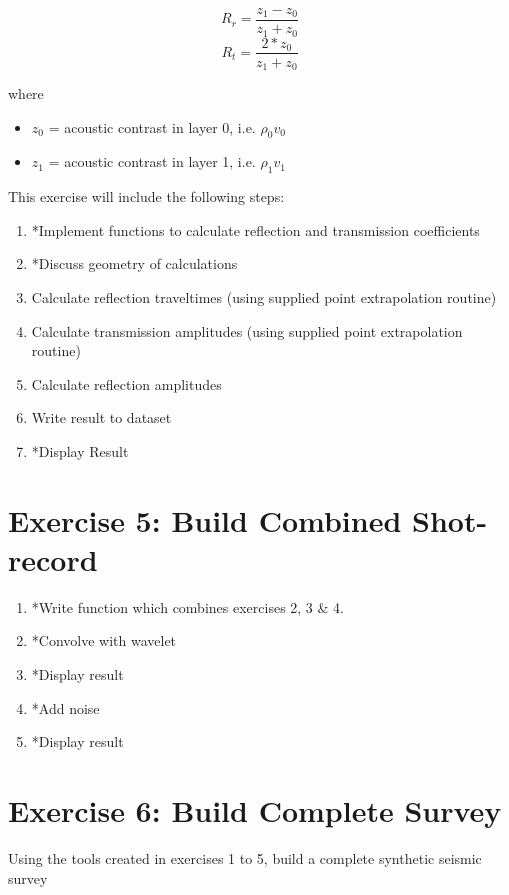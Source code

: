 \documentclass[a4paper, 10pt]{article}
\begin{document}
\[ R_r = \frac{z_1 - z_0}{z_1+z_0}\]
\[ R_t = \frac{2*z_0}{z_1+z_0}\]

where 
\begin{itemize}
\item $z_0$  = acoustic contrast in layer 0, i.e. $\rho_0 v_0$
\item $z_1$ = acoustic contrast in layer 1, i.e. $\rho_1 v_1$
\end{itemize}

This exercise will include the following steps:


\begin{enumerate}
\item *Implement functions to calculate reflection and transmission coefficients
\item *Discuss geometry of calculations
\item Calculate reflection traveltimes (using supplied point extrapolation routine)
\item Calculate transmission amplitudes (using supplied point extrapolation routine)
\item Calculate reflection amplitudes
\item Write result to dataset
\item *Display Result
\end{enumerate}


\section*{Exercise 5: Build Combined Shot-record}

\begin{enumerate}
\item *Write function which combines exercises 2, 3 \& 4.
\item *Convolve with wavelet
\item *Display result
\item *Add noise
\item *Display result
\end{enumerate}
\section*{Exercise 6: Build Complete Survey}

Using the tools created in exercises 1 to 5, build a complete synthetic seismic survey
\newpage






\end{document}
